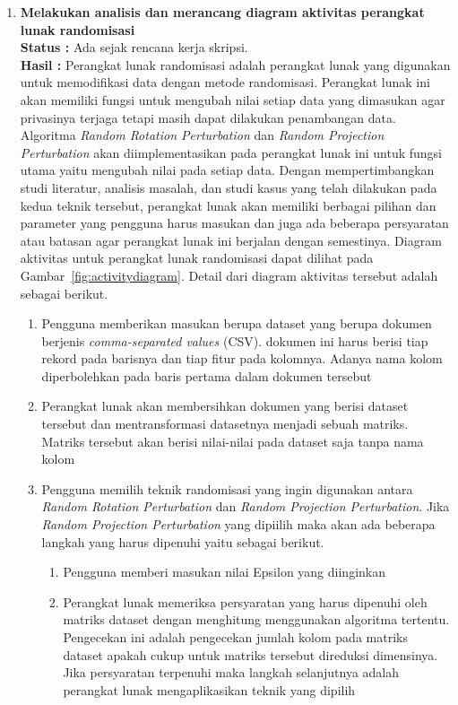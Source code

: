 \documentclass[a4paper,twoside]{article}
\begin{document}
\begin{enumerate}
		\item \textbf{Melakukan analisis dan merancang diagram aktivitas perangkat lunak randomisasi}\\
		{\bf Status :} Ada sejak rencana kerja skripsi.\\
		{\bf Hasil :} Perangkat lunak randomisasi adalah perangkat lunak yang digunakan untuk memodifikasi data dengan metode randomisasi. Perangkat lunak ini akan memiliki fungsi untuk mengubah nilai setiap data yang dimasukan agar privasinya terjaga tetapi masih dapat dilakukan penambangan data. Algoritma \textit{Random Rotation Perturbation} dan \textit{Random Projection Perturbation} akan diimplementasikan pada perangkat lunak ini untuk fungsi utama yaitu mengubah nilai pada setiap data. Dengan mempertimbangkan studi literatur, analisis masalah, dan studi kasus yang telah dilakukan pada kedua teknik tersebut, perangkat lunak akan memiliki berbagai pilihan dan parameter yang pengguna harus masukan dan juga ada beberapa persyaratan atau batasan agar perangkat lunak ini berjalan dengan semestinya. Diagram aktivitas untuk perangkat lunak randomisasi dapat dilihat pada Gambar~\ref{fig:activitydiagram}. Detail dari diagram aktivitas tersebut adalah sebagai berikut.
		\begin{enumerate}
			\item Pengguna memberikan masukan berupa dataset yang berupa dokumen berjenis \textit{comma-separated values} (CSV). dokumen ini harus berisi tiap rekord pada barisnya dan tiap fitur pada kolomnya. Adanya nama kolom diperbolehkan pada baris pertama dalam dokumen tersebut
			\item Perangkat lunak akan membersihkan dokumen yang berisi dataset tersebut dan mentransformasi datasetnya menjadi sebuah matriks. Matriks tersebut akan berisi nilai-nilai pada dataset saja tanpa nama kolom
			\item Pengguna memilih teknik randomisasi yang ingin digunakan antara \textit{Random Rotation Perturbation} dan \textit{Random Projection Perturbation}. Jika \textit{Random Projection Perturbation} yang dipiilih maka akan ada beberapa langkah yang harus dipenuhi yaitu sebagai berikut.
			\begin{enumerate}
				\item Pengguna memberi masukan nilai Epsilon yang diinginkan
				\item Perangkat lunak memeriksa persyaratan yang harus dipenuhi oleh matriks dataset dengan menghitung menggunakan algoritma tertentu. Pengecekan ini adalah pengecekan jumlah kolom pada matriks dataset apakah cukup untuk matriks tersebut direduksi dimensinya. Jika persyaratan terpenuhi maka langkah selanjutnya adalah perangkat lunak mengaplikasikan teknik yang dipilih

\end{enumerate}
\end{enumerate}
\end{enumerate}
\end{document}
